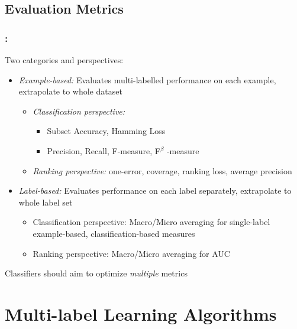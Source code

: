 \documentclass{beamer}
\begin{document}
\subsection{Evaluation Metrics}
\begin{frame}
\frametitle{\insertsection : \insertsubsection}
Two categories and perspectives:
\begin{itemize}
\item \emph{Example-based: }Evaluates multi-labelled performance on each example, extrapolate to whole dataset
\begin{itemize}
\item \emph{Classification perspective:}
\begin{itemize}
\item Subset Accuracy, Hamming Loss
\item Precision, Recall, F-measure, F$^\beta$ -measure
\end{itemize}
\item \emph{Ranking perspective:} one-error, coverage, ranking loss, average precision
\end{itemize}
\item \emph{Label-based: }Evaluates performance on each label separately, extrapolate to whole label set
\begin{itemize}
\item Classification perspective: Macro/Micro averaging for single-label example-based, classification-based measures
\item Ranking perspective: Macro/Micro averaging for AUC
\end{itemize}
\end{itemize}
Classifiers should aim to optimize \emph{multiple} metrics
\end{frame}
\section{Multi-label Learning Algorithms}
\end{document}
